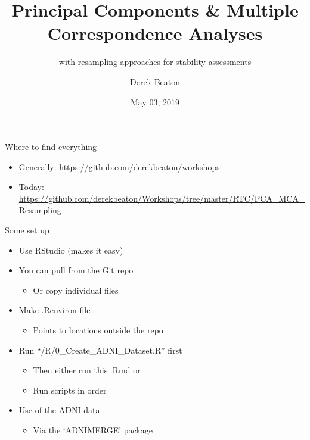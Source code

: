 \documentclass[
  ignorenonframetext,
]{beamer}
\title{Principal Components \& Multiple Correspondence Analyses}
\subtitle{with resampling approaches for stability assessments}
\author{Derek Beaton}
\date{May 03, 2019}
\institute{RRI RTC}
\providecommand{\tightlist}{%
  \setlength{\itemsep}{0pt}\setlength{\parskip}{0pt}}
\begin{document}
\frame{\titlepage}

\begin{frame}{Where to find everything}
\protect\hypertarget{where-to-find-everything}{}

\begin{itemize}[<+->]
\tightlist
\item
  Generally: \url{https://github.com/derekbeaton/workshops}
\item
  Today:
  \url{https://github.com/derekbeaton/Workshops/tree/master/RTC/PCA_MCA_Resampling}
\end{itemize}

\end{frame}

\begin{frame}{Some set up}
\protect\hypertarget{some-set-up}{}

\begin{itemize}[<+->]
\tightlist
\item
  Use RStudio (makes it easy)
\item
  You can pull from the Git repo

  \begin{itemize}[<+->]
  \tightlist
  \item
    Or copy individual files
  \end{itemize}
\item
  Make .Renviron file

  \begin{itemize}[<+->]
  \tightlist
  \item
    Points to locations outside the repo
  \end{itemize}
\item
  Run ``/R/0\_Create\_ADNI\_Dataset.R'' first

  \begin{itemize}[<+->]
  \tightlist
  \item
    Then either run this .Rmd or
  \item
    Run scripts in order
  \end{itemize}
\item
  Use of the ADNI data

  \begin{itemize}[<+->]
  \tightlist
  \item
    Via the `ADNIMERGE' package
  \end{itemize}
\end{itemize}

\end{frame}
\end{document}
